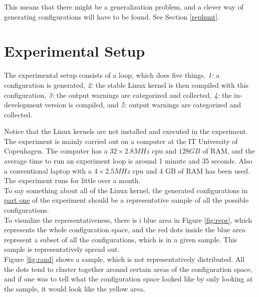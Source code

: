 \documentclass[a4paper,11pt]{report}
\begin{document}
This means that there might be a generalization problem, and a clever way of 
generating configurations will have to be found. See Section \ref{rephunt}.



            \section{Experimental Setup}
The experimental setup consists of a loop, which does five things. \emph{1:} a 
configuration is generated, \emph{2:} the stable Linux kernel is then compiled with 
this configuration, \emph{3:} the output warnings are categorized and 
collected, \emph{4:} the in-development version is compiled, and \emph{5:} output warnings are categorized and collected.

Notice that the Linux kernels are not installed and executed in the experiment.
\\

The experiment is mainly carried out on a computer at the IT University of 
Copenhagen. The computer has a $32\times2.8 MHz$ cpu and $128 GB$ of RAM, and 
the average time to run an experiment loop is around 1 minute and 35 seconds. 
Also a conventional laptop with a $4\times2.5 MHz$  cpu and 4 GB of RAM has 
been used. The experiment runs for little over a month.
\\


To say something about all of the Linux kernel, the generated configurations 
in \underline{part one} of the experiment  should be a representative sample of all the 
possible configurations. 
\\


To visualize the representativeness, there is i blue area in Figure \ref{fig:repr}, which represents the whole configuration 
space, and the red dots inside the blue area represent a subset of all the 
configurations, which is in a given sample. This sample is representatively spread out.
\\


Figure \ref{fig:rand} shows a sample, which is not representatively 
distributed. All the dots tend to cluster together around certain areas of the 
configuration space, and if one was to tell what the configuration space looked 
like by only looking at the sample, it would look like the yellow area.
\end{document}
